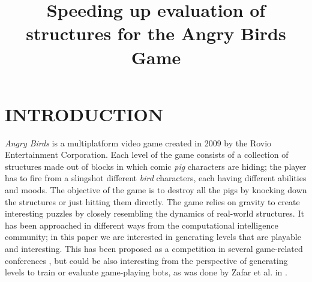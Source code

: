 \documentclass[a4paper,twoside]{article}
\begin{document}
\title{Speeding up evaluation of structures for the Angry Birds Game}

\author{
}



\onecolumn \maketitle \normalsize \setcounter{footnote}{0} \vfill

\section{\uppercase{Introduction}}
\label{sec:intro}
\textit{Angry Birds} is a multiplatform video game created in 2009 by
the Rovio Entertainment  Corporation. Each level of the game consists
of a collection of structures made out of blocks in which comic  {\em
  pig} characters are hiding;  the player has to fire from a slingshot
different {\em bird} characters, each having different abilities and
moods.  The objective of the game is to destroy all the pigs by
knocking down the structures or just hitting them directly.  The game
relies on gravity to create interesting puzzles by closely resembling
the dynamics of real-world structures. It has been approached in
different ways from the computational intelligence community; in this
paper we are interested in generating levels that are playable and
interesting. This has been proposed as a competition in several
game-related conferences
\cite{AngryBirds_LevelGeneration_18,GAIG_LevelGeneration_18}, but
could be also interesting from the perspective of generating levels
to train or evaluate game-playing bots, as was done by Zafar et al. in
\cite{zafar2019corpus}.
\end{document}
